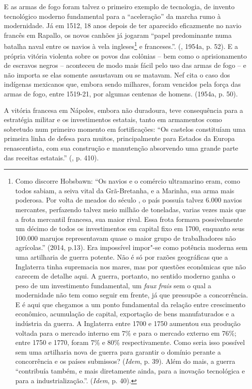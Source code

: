 E as armas de fogo foram talvez o primeiro exemplo de tecnologia, de
invento tecnológico moderno fundamental para a ``aceleração'' da marcha
rumo à modernidade. Já em 1512, 18 anos depois de ter aparecido
eficazmente no navio francês em Rapallo, os novos canhões já jogaram
``papel predominante numa batalha naval entre os navios à vela
ingleses\footnote{Como discorre Hobsbawn: ``Os navios e o comércio ultramarino eram,
  como todos sabiam, a seiva vital da Grã-Bretanha, e a Marinha, sua
  arma mais poderosa. Por volta de meados do século , o país
  possuía talvez 6.000 navios mercantes, perfazendo talvez meio milhão
  de toneladas, varias vezes mais que a frota mercantil francesa, sua
  maior rival. Essa frota formava possivelmente um décimo de todos os
  investimentos em capital fixo em 1700, enquanto seus 100.000 marujos
  representavam quase o maior grupo de trabalhadores não agrícolas.''
  (2014, p.13). Era impossível impor"-se como potência moderna sem uma
  artilharia de guerra potente. Não é só por razões geográficas que a
  Inglaterra tinha supremacia nos mares, mas por questões econômicas que
  não carecem de detalhe aqui. A guerra, portanto, no sentido moderno
  ganha o peso de um investimento fundamental, um \emph{faux}
  \emph{frais} sem o qual a modernidade não tem como seguir em frente,
  já que pressupõe a concorrência. E é aqui que chegamos a um ponto
  fundamental da relação entre crescimento econômico, acumulação de
  capital, exportação de bens manufaturados e a indústria da guerra. A
  Inglaterra entre 1700 e 1750 aumentou sua produção voltada para o
  mercado interno em 7\% e para o mercado externo em 76\%; entre 1750 e
  1770, foram 7\% e 80\% respectivamente. Como seria isso possível sem
  uma artilharia nova de guerra para garantir o domínio perante a
  concorrência e os países submissos? (\emph{Idem}, p. 39). Além do
  mais, a guerra ``contribuía também, e mais diretamente ainda, para a
  inovação tecnológica e para a industrialização.''. (\emph{Idem}, p.
  40).} e franceses.''. (, 1954a, p. 52). E a própria vitória
violenta sobre os povos das colônias -- bem como o aprisionamento de
escravos negros -- aconteceu de modo mais fácil pelo uso das armas de
fogo -- e não importa se elas somente assustavam ou se matavam. Nef cita
o caso dos indígenas mexicanos que, embora sendo milhares, foram
vencidos pela força das armas de fogo, entre 1519-21, por algumas
centenas de homens. (1954a, p. 50).

A vitória francesa em Nápoles, embora não duradoura, teve consequência
para a estratégia militar e os investimentos estatais, tanto em
armamentos como sobretudo num primeiro momento em fortificações: ``Os
castelos constituíam uma primeira linha de defesa para muitos,
principalmente para Estados da Europa renascentista, com sua construção
e manutenção absorvendo uma grande parte das receitas estatais.''
(, p. 410).

